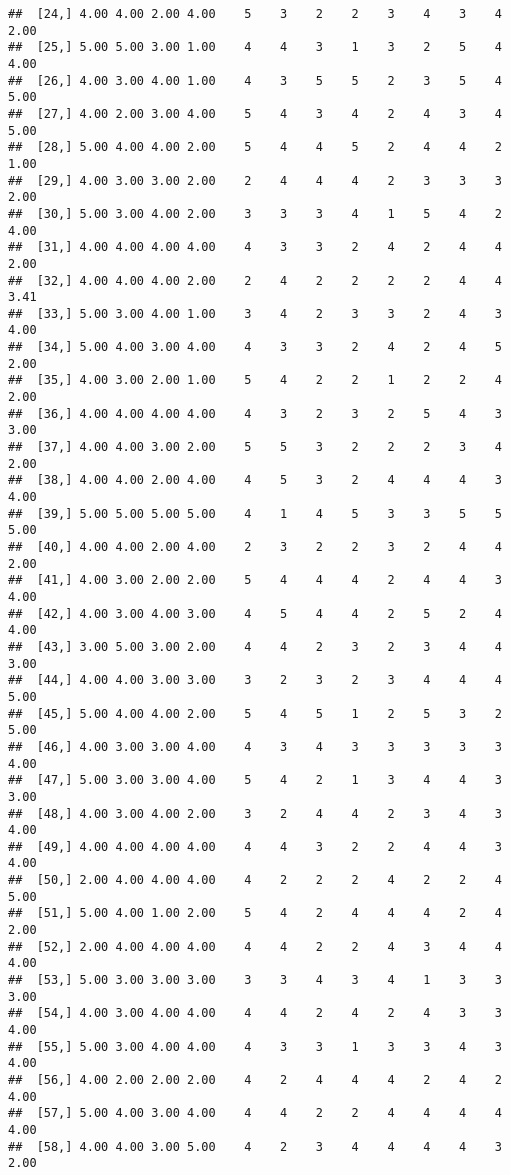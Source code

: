 \documentclass[]{article}
\begin{document}
\begin{verbatim}
##  [24,] 4.00 4.00 2.00 4.00    5    3    2    2    3    4    3    4 2.00
##  [25,] 5.00 5.00 3.00 1.00    4    4    3    1    3    2    5    4 4.00
##  [26,] 4.00 3.00 4.00 1.00    4    3    5    5    2    3    5    4 5.00
##  [27,] 4.00 2.00 3.00 4.00    5    4    3    4    2    4    3    4 5.00
##  [28,] 5.00 4.00 4.00 2.00    5    4    4    5    2    4    4    2 1.00
##  [29,] 4.00 3.00 3.00 2.00    2    4    4    4    2    3    3    3 2.00
##  [30,] 5.00 3.00 4.00 2.00    3    3    3    4    1    5    4    2 4.00
##  [31,] 4.00 4.00 4.00 4.00    4    3    3    2    4    2    4    4 2.00
##  [32,] 4.00 4.00 4.00 2.00    2    4    2    2    2    2    4    4 3.41
##  [33,] 5.00 3.00 4.00 1.00    3    4    2    3    3    2    4    3 4.00
##  [34,] 5.00 4.00 3.00 4.00    4    3    3    2    4    2    4    5 2.00
##  [35,] 4.00 3.00 2.00 1.00    5    4    2    2    1    2    2    4 2.00
##  [36,] 4.00 4.00 4.00 4.00    4    3    2    3    2    5    4    3 3.00
##  [37,] 4.00 4.00 3.00 2.00    5    5    3    2    2    2    3    4 2.00
##  [38,] 4.00 4.00 2.00 4.00    4    5    3    2    4    4    4    3 4.00
##  [39,] 5.00 5.00 5.00 5.00    4    1    4    5    3    3    5    5 5.00
##  [40,] 4.00 4.00 2.00 4.00    2    3    2    2    3    2    4    4 2.00
##  [41,] 4.00 3.00 2.00 2.00    5    4    4    4    2    4    4    3 4.00
##  [42,] 4.00 3.00 4.00 3.00    4    5    4    4    2    5    2    4 4.00
##  [43,] 3.00 5.00 3.00 2.00    4    4    2    3    2    3    4    4 3.00
##  [44,] 4.00 4.00 3.00 3.00    3    2    3    2    3    4    4    4 5.00
##  [45,] 5.00 4.00 4.00 2.00    5    4    5    1    2    5    3    2 5.00
##  [46,] 4.00 3.00 3.00 4.00    4    3    4    3    3    3    3    3 4.00
##  [47,] 5.00 3.00 3.00 4.00    5    4    2    1    3    4    4    3 3.00
##  [48,] 4.00 3.00 4.00 2.00    3    2    4    4    2    3    4    3 4.00
##  [49,] 4.00 4.00 4.00 4.00    4    4    3    2    2    4    4    3 4.00
##  [50,] 2.00 4.00 4.00 4.00    4    2    2    2    4    2    2    4 5.00
##  [51,] 5.00 4.00 1.00 2.00    5    4    2    4    4    4    2    4 2.00
##  [52,] 2.00 4.00 4.00 4.00    4    4    2    2    4    3    4    4 4.00
##  [53,] 5.00 3.00 3.00 3.00    3    3    4    3    4    1    3    3 3.00
##  [54,] 4.00 3.00 4.00 4.00    4    4    2    4    2    4    3    3 4.00
##  [55,] 5.00 3.00 4.00 4.00    4    3    3    1    3    3    4    3 4.00
##  [56,] 4.00 2.00 2.00 2.00    4    2    4    4    4    2    4    2 4.00
##  [57,] 5.00 4.00 3.00 4.00    4    4    2    2    4    4    4    4 4.00
##  [58,] 4.00 4.00 3.00 5.00    4    2    3    4    4    4    4    3 2.00

\end{verbatim}
\end{document}
